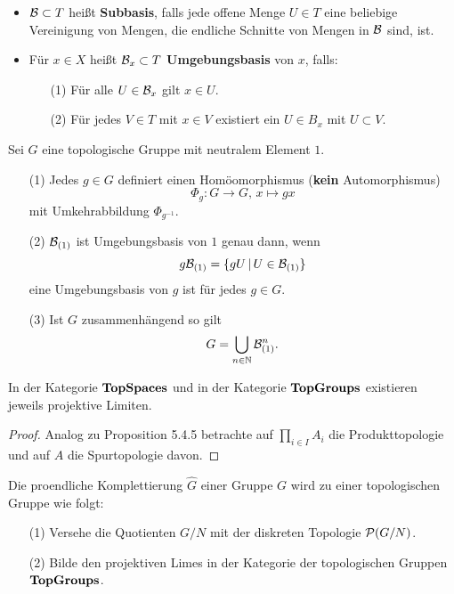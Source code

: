 \begin{remin}
\begin{itemize}
\item $\mathcal{B} \subset T$ heißt \textbf{Subbasis}, falls jede offene Menge $U\in T$ eine beliebige Vereinigung von Mengen, die endliche Schnitte von Mengen in $\mathcal{B}$ sind, ist.
\item Für $x\in X$ heißt $\mathcal{B}_x\subset T$ \textbf{Umgebungsbasis} von $x$, falls:
\begin{enumerate}
\item[(1)] Für alle $U \in \mathcal{B}_x$ gilt $x \in U$.
\item[(2)] Für jedes $V\in T$ mit $x \in V$ existiert ein $U\in B_x$ mit $U \subset V$.
\end{enumerate}
\end{itemize}
\end{remin}

\begin{Bem}
Sei $G$ eine topologische Gruppe mit neutralem Element $1$.
\begin{enumerate}
\item[(1)] Jedes $g\in G$ definiert einen Homöomorphismus (\textbf{kein} Automorphismus)
\[ \Phi_g \colon G \to G, \, x\mapsto gx
\]
mit Umkehrabbildung $\Phi_{g^{-1}}$.
\item[(2)] $\mathcal{B}_{(1)}$ ist Umgebungsbasis von $1$ genau dann, wenn
\[ g \mathcal{B}_{(1)} = \{ gU \, | \, U \in \mathcal{B}_{(1)} \}
\]
eine Umgebungsbasis von $g$ ist für jedes $g \in G$.
\item[(3)] Ist $G$ zusammenhängend so gilt
\[ G = \bigcup_{n \in \mathbb{N}} \mathcal{B}_{(1)}^n.
\]
\end{enumerate}
\end{Bem}


\begin{Bem}
In der Kategorie $\textbf{\text{{TopSpaces}}}$ und in der Kategorie $\textbf{\text{{TopGroups}}}$ existieren jeweils projektive Limiten.
\end{Bem}


\begin{proof}
Analog zu Proposition 5.4.5 betrachte auf $\prod_{i\in I}A_i$ die Produkttopologie und auf $A$ die Spurtopologie davon.
\end{proof}

\begin{Bem}
Die proendliche Komplettierung $\hat{G}$ einer Gruppe $G$ wird zu einer topologischen Gruppe wie folgt:
\begin{itemize}
\item[(1)] Versehe die Quotienten $G/N$ mit der diskreten Topologie $\mathcal{P}(G/N)$.
\item[(2)] Bilde den projektiven Limes in der Kategorie der topologischen Gruppen $\textbf{\text{{TopGroups}}}$.
\end{itemize}
\end{Bem}

